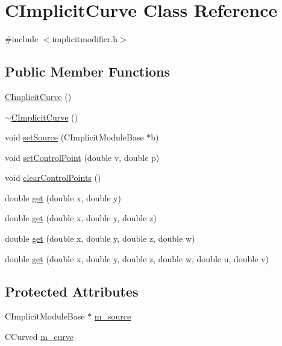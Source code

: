 \hypertarget{classCImplicitCurve}{
\section{CImplicitCurve Class Reference}
\label{classCImplicitCurve}
}


{\ttfamily \#include $<$implicitmodifier.h$>$}\subsection*{Public Member Functions}
\begin{DoxyCompactItemize}
\item 
\hyperlink{classCImplicitCurve_a2155b648384213759f6d443d54fef0bf}{CImplicitCurve} ()
\item 
\hyperlink{classCImplicitCurve_aba7466bd5d66bd2a044e737f8670e23d}{$\sim$CImplicitCurve} ()
\item 
void \hyperlink{classCImplicitCurve_a2ae6ea3e20e5d44a92f55770474d824e}{setSource} (CImplicitModuleBase $\ast$b)
\item 
void \hyperlink{classCImplicitCurve_a8b39f01585cda0eb50932ee1e21aeb7d}{setControlPoint} (double v, double p)
\item 
void \hyperlink{classCImplicitCurve_af006f40b516aa3ab77d867c3a14894a7}{clearControlPoints} ()
\item 
double \hyperlink{classCImplicitCurve_a3b95aace39fbfbd95328b5c056863db7}{get} (double x, double y)
\item 
double \hyperlink{classCImplicitCurve_a65893329ee6d291e41593d79c672d21b}{get} (double x, double y, double z)
\item 
double \hyperlink{classCImplicitCurve_a5207d262ea986451e41df772b9450104}{get} (double x, double y, double z, double w)
\item 
double \hyperlink{classCImplicitCurve_ac36ef3ec30d297a35e45a2b9ee6ddef4}{get} (double x, double y, double z, double w, double u, double v)
\end{DoxyCompactItemize}
\subsection*{Protected Attributes}
\begin{DoxyCompactItemize}
\item 
CImplicitModuleBase $\ast$ \hyperlink{classCImplicitCurve_a7742f1bd9b4e09b6c852c91520cbad2e}{m\_\-source}
\item 
CCurved \hyperlink{classCImplicitCurve_aad05fbfe55c7ff91cdeb2a656e64949a}{m\_\-curve}
\end{DoxyCompactItemize}


